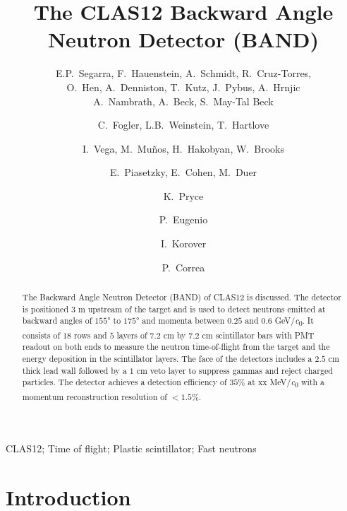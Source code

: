 \documentclass[3p,final,twocolumn]{elsarticle}
\newcommand*{\MIT }{Massachusetts Institute of Technology, Cambridge, Massachusetts 02139, USA}
\newcommand*{\ODU}{Old Dominion University, Norfolk, Virginia 23529}
\newcommand*{\TAU }{School of Physics and Astronomy, Tel Aviv University, Tel Aviv 69978, Israel}
\newcommand*{\NRC}{Nuclear Research Center Negev, Be'er Sheva 84190, Israel}
\begin{document}
\begin{frontmatter}

\title{The CLAS12 Backward Angle Neutron Detector (BAND) }

\author{E.P.~Segarra, F.~Hauenstein, A.~Schmidt, R.~Cruz-Torres, \\O.~Hen, A.~Denniston, T.~Kutz, J.~Pybus, A.~Hrnjic\\A.~Nambrath, A.~Beck, S.~May-Tal Beck}
\address{\MIT}
\author{C.~Fogler, L.B.~Weinstein, T.~Hartlove}
\address{\ODU}
\author{I.~Vega, M.~Mu\~nos, H.~Hakobyan, W.~Brooks}
\address{UTFSM}
\author{E.~Piasetzky, E.~Cohen, M.~Duer}
\address{\TAU}
\author{K.~Pryce}
\address{Orsay}
\author{P.~Eugenio}
\address{FSU}
\author{I.~Korover}
\address{\NRC}
\author{P.~Correa}
\address{}

\author[]{}
\ead[]{}

\begin{abstract}
The Backward Angle Neutron Detector (BAND) of CLAS12 is discussed. The detector is positioned $3$ \si{\meter} upstream of the target and is used to 
detect neutrons emitted at backward angles of $155$\si{\degree} to $175$\si{\degree} and momenta between $0.25$ and $0.6$ \si{\GeV/\clight}. It consists of $18$ rows and $5$ layers of $7.2$ \si{\centi\meter} 
by $7.2$ \si{\centi\meter} scintillator bars with PMT readout on both ends to measure the neutron time-of-flight from the target and the 
energy deposition in the scintillator layers. The face of the detectors includes a $2.5$ \si{\centi\meter} thick lead wall followed by a $1$ \si{\centi\meter} veto layer to suppress gammas and reject charged particles. The detector achieves a  detection efficiency of 
$35$\% at xx \si{\MeV/\clight} with a momentum reconstruction resolution of $<1.5$\%.
\end{abstract}

\begin{keyword}
CLAS12; Time of flight; Plastic scintillator; Fast neutrons
\end{keyword}
\end{frontmatter}

\linenumbers

\section{Introduction}
\end{document}
